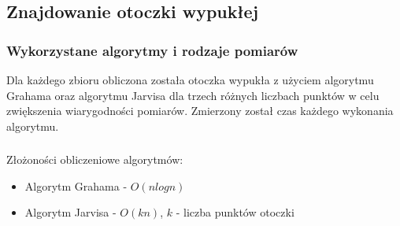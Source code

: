 \documentclass[11pt]{scrartcl}
\begin{document}
    \subsection{Znajdowanie otoczki wypukłej}
    \subsubsection{Wykorzystane algorytmy i rodzaje pomiarów}
    Dla każdego zbioru obliczona została otoczka wypukła z użyciem algorytmu
    Grahama oraz algorytmu Jarvisa dla trzech różnych liczbach punktów
    w celu zwiększenia wiarygodności pomiarów. Zmierzony został czas każdego
    wykonania algorytmu.

    \subsubsection*{}
    Złożoności obliczeniowe algorytmów:
    \begin{itemize}
        \item Algorytm Grahama - $O(nlogn)$
        \item Algorytm Jarvisa - $O(kn)$, $k$ - liczba punktów otoczki
    \end{itemize}
\end{document}
